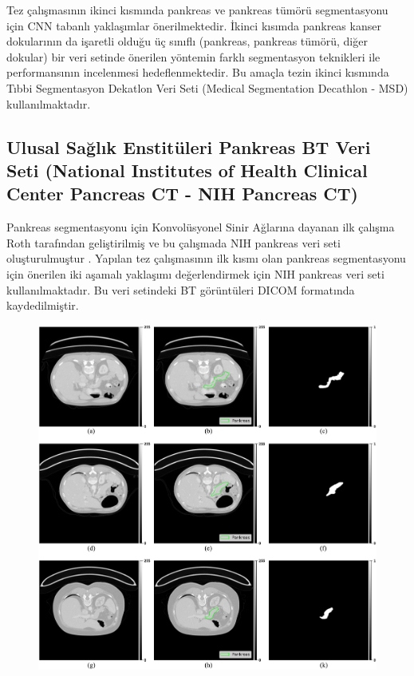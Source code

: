 Tez çalışmasının ikinci kısmında pankreas ve pankreas tümörü segmentasyonu için CNN tabanlı yaklaşımlar önerilmektedir. İkinci kısımda pankreas kanser dokularının da işaretli olduğu üç sınıflı (pankreas, pankreas tümörü, diğer dokular) bir veri setinde önerilen yöntemin farklı segmentasyon teknikleri ile performansının incelenmesi hedeflenmektedir. Bu amaçla tezin ikinci kısmında Tıbbi Segmentasyon Dekatlon Veri Seti (Medical Segmentation Decathlon - MSD) kullanılmaktadır.

\subsection{Ulusal Sağlık Enstitüleri Pankreas BT Veri Seti (National Institutes of Health Clinical Center Pancreas CT - NIH Pancreas CT)}

Pankreas segmentasyonu için Konvolüsyonel Sinir Ağlarına dayanan ilk çalışma Roth tarafından geliştirilmiş ve bu çalışmada NIH pankreas veri seti oluşturulmuştur \cite{roth2015deep}. Yapılan tez çalışmasının ilk kısmı olan pankreas segmentasyonu için önerilen iki aşamalı yaklaşımı değerlendirmek için NIH pankreas veri seti kullanılmaktadır. Bu veri setindeki BT görüntüleri DICOM formatında kaydedilmiştir.

\begin{figure}[h!]
	\begin{center}
		\vspace{0.4cm}
		{
			\vspace{0.4cm}
			\includegraphics[scale=0.42]{Yapilan-Calismalar/Figures/nih_2dslices.pdf}
		}
	\end{center}
\end{figure} 

